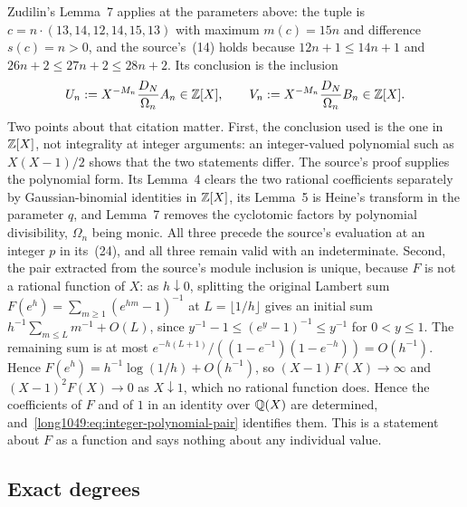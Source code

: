 \documentclass[11pt]{article}
\begin{document}
Zudilin's Lemma~7 \cite[p.~161, (23)]{zudilin2004} applies at the parameters above: the tuple is
$c=n\cdot(13,14,12,14,15,13)$ with maximum $m(c)=15n$ and difference $s(c)=n>0$,
and the source's~(14) holds because $12n+1\le14n+1$ and
$26n+2\le27n+2\le28n+2$.  Its conclusion is the inclusion
\begin{equation}\label{long1049:eq:integer-polynomial-pair}
 U_n:=X^{-M_n}\frac{D_N}{\Omega_n}A_n\in\Z[X],\qquad
 V_n:=X^{-M_n}\frac{D_N}{\Omega_n}B_n\in\Z[X].
\end{equation}
Two points about that citation matter.  First, the conclusion used is the one
in $\mathbb{Z}[X]$, not integrality at integer arguments: an integer-valued polynomial
such as $X(X-1)/2$ shows that the two statements differ.  The source's proof
supplies the polynomial form.  Its Lemma~4 clears the two rational coefficients
separately by Gaussian-binomial identities in $\mathbb{Z}[X]$, its Lemma~5 is Heine's
transform in the parameter $q$, and Lemma~7 removes the cyclotomic factors by
polynomial divisibility, $\Omega_n$ being monic.  All three precede the source's
evaluation at an integer $p$ in its~(24), and all three remain valid with an
indeterminate.  Second, the pair extracted from the source's module inclusion is
unique, because $F$ is not a rational function of $X$: as $h\downarrow0$,
splitting the original Lambert sum $F(e^h)=\sum_{m\ge1}(e^{hm}-1)^{-1}$
at $L=\lfloor1/h\rfloor$ gives an initial sum
$h^{-1}\sum_{m\le L}m^{-1}+O(L)$, since
$y^{-1}-1\le(e^y-1)^{-1}\le y^{-1}$ for $0<y\le1$.
The remaining sum is at most
$e^{-h(L+1)}/((1-e^{-1})(1-e^{-h}))=O(h^{-1})$.  Hence
$F(e^h)=h^{-1}\log(1/h)+O(h^{-1})$, so
$(X-1)F(X)\to\infty$ and $(X-1)^{2}F(X)\to0$ as $X\downarrow1$, which no
rational function does.  Hence the coefficients of $F$ and of $1$ in an identity
over $\mathbb{Q}(X)$ are determined, and~\eqref{long1049:eq:integer-polynomial-pair} identifies
them.  This is a statement about $F$ as a function and says nothing about any
individual value.

\subsection{Exact degrees}\label{long1049:sec:degrees}
\end{document}
